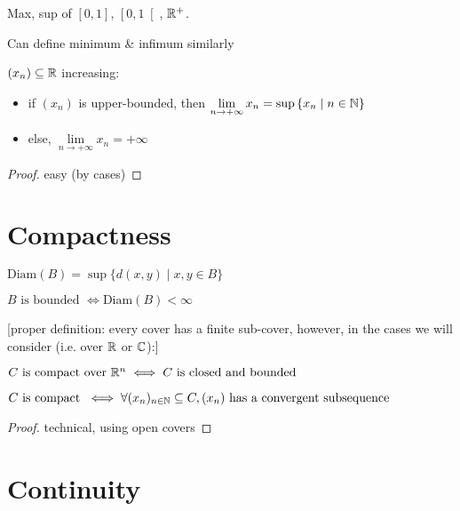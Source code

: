 \begin{question}
	Max, sup of $\left[ 0,1 \right]$, $\left[ 0,1 \right[$, $\mathbb{R}^+$.
\end{question}

\begin{remark}
	Can define minimum \& infimum similarly
\end{remark}

\begin{theorem}
	$(x_n) \subseteq \mathbb{R}$ increasing:
	\begin{itemize}
		\item if $(x_n)$ is upper-bounded, then $\lim\limits_{n \to +\infty} x_n = \sup \left\{ x_n \mid n \in \mathbb{N} \right\}$
		\item else, $\lim\limits_{n \to +\infty} x_n = +\infty$
	\end{itemize}
\end{theorem}
\begin{proof}
	easy (by cases)
\end{proof}



\section{Compactness}
\begin{definition}[Diameter]
	$\text{Diam}(B)=\sup\{ d(x,y) \mid x,y \in B \}$
\end{definition}
\begin{definition}[Boundedness]
	$B \text{ is bounded } \iff \text{Diam}(B)<\infty$ 
\end{definition}
[proper definition: every cover has a finite sub-cover, however, in the cases we will consider (i.e. over $\mathbb{R}$ or $\mathbb{C}$):]
\begin{definition}
	$C \text{ is compact over } \mathbb{R}^n \iff C \text{ is closed and bounded}$ 
\end{definition}
\begin{property}
	$C \text{ is compact } \iff \forall (x_n)_{n \in \mathbb{N}} \subseteq C, (x_n) \text{ has a convergent subsequence}$
\end{property}
\begin{proof}
	technical, using open covers
\end{proof}



\section{Continuity}

